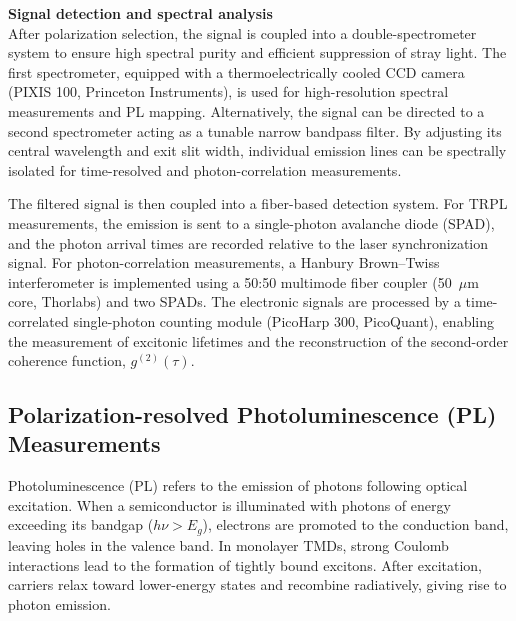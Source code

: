 

\vspace{1em}
\noindent \textbf{Signal detection and spectral analysis} \\

After polarization selection, the signal is coupled into a double-spectrometer system to ensure high spectral purity and efficient suppression of stray light. The first spectrometer, equipped with a thermoelectrically cooled CCD camera (PIXIS 100, Princeton Instruments), is used for high-resolution spectral measurements and PL mapping. Alternatively, the signal can be directed to a second spectrometer acting as a tunable narrow bandpass filter. By adjusting its central wavelength and exit slit width, individual emission lines can be spectrally isolated for time-resolved and photon-correlation measurements.

The filtered signal is then coupled into a fiber-based detection system. For TRPL measurements, the emission is sent to a single-photon avalanche diode (SPAD), and the photon arrival times are recorded relative to the laser synchronization signal. For photon-correlation measurements, a Hanbury Brown--Twiss interferometer is implemented using a 50:50 multimode fiber coupler (50~$\mu$m core, Thorlabs) and two SPADs. The electronic signals are processed by a time-correlated single-photon counting module (PicoHarp 300, PicoQuant), enabling the measurement of excitonic lifetimes and the reconstruction of the second-order coherence function, $g^{(2)}(\tau)$.


\subsection{Polarization-resolved Photoluminescence (PL) Measurements}
\label{subsec:polarization_pl}


Photoluminescence (PL) refers to the emission of photons following optical excitation. When a semiconductor is illuminated with photons of energy exceeding its bandgap ($h\nu > E_g$), electrons are promoted to the conduction band, leaving holes in the valence band. In monolayer TMDs, strong Coulomb interactions lead to the formation of tightly bound excitons. After excitation, carriers relax toward lower-energy states and recombine radiatively, giving rise to photon emission.


